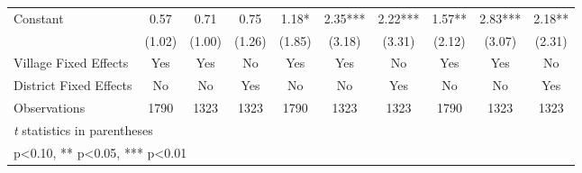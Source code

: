 \begin{sidewaystable}[htbp]
\begin{tabular}{l*{9}{c}}
Constant        &     0.57   &     0.71   &     0.75   &     1.18*  &     2.35***&     2.22***&     1.57** &     2.83***&     2.18** \\
                &   (1.02)   &   (1.00)   &   (1.26)   &   (1.85)   &   (3.18)   &   (3.31)   &   (2.12)   &   (3.07)   &   (2.31)   \\
Village Fixed Effects&      Yes   &      Yes   &       No   &      Yes   &      Yes   &       No   &      Yes   &      Yes   &       No   \\
District Fixed Effects&       No   &       No   &      Yes   &       No   &       No   &      Yes   &       No   &       No   &      Yes   \\
\midrule
Observations    &     1790   &     1323   &     1323   &     1790   &     1323   &     1323   &     1790   &     1323   &     1323   \\
\bottomrule
\multicolumn{10}{l}{\footnotesize \textit{t} statistics in parentheses}\\
\multicolumn{10}{l}{\footnotesize * p<0.10, ** p<0.05, *** p<0.01}\\
\end{tabular}
\end{sidewaystable}
